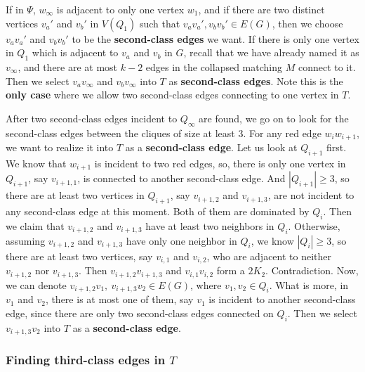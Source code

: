 \documentclass{amsart}
\theoremstyle{definition}
\begin{document}
If in $\Psi$, $w_{\infty}$ is adjacent to only one vertex $w_1$, and if there are two distinct vertices $v_a'$ and $v_b'$ in $V(Q_1)$ such that $v_av_a',v_bv_b'\in E(G)$, then we choose $v_av_a'$ and $v_bv_b'$ to be the {\bf second-class edges} we want. If there is only one vertex in $Q_1$ which is adjacent to $v_a$ and $v_b$ in $G$, recall that we have already named it as $v_{\infty}$, and there are at most $k-2$ edges in the collapsed matching $M$ connect to it. Then we select $v_av_{\infty}$ and $v_bv_{\infty}$ into $T$ as {\bf second-class edges}. Note this is the {\bf only case} where we allow two second-class edges connecting to one vertex in $T$.





After two second-class edges incident to $Q_{\infty}$ are found, we go on to look for the second-class edges between the cliques of size at least 3.
For any red edge $w_iw_{i+1}$, we want to realize it into $T$ as a {\bf second-class edge}. Let us look at $Q_{i+1}$ first. We know that $w_{i+1}$ is incident to two red edges, so, there is only one vertex in $Q_{i+1}$, say $v_{i+1,1}$, is connected to another second-class edge. And $|Q_{i+1}|\ge3$, so there are at least two vertices in $Q_{i+1}$, say $v_{i+1,2}$ and $v_{i+1,3}$, are not incident to any second-class edge at this moment. Both of them are dominated by $Q_i$. Then we claim that $v_{i+1,2}$ and $v_{i+1,3}$ have at least two neighbors in $Q_i$. Otherwise, assuming $v_{i+1,2}$ and $v_{i+1,3}$ have only one neighbor in $Q_i$, we know $|Q_i|\ge3$, so there are at least two vertices, say $v_{i,1}$ and $v_{i,2}$, who are adjacent to neither $v_{i+1,2}$ nor $v_{i+1,3}$. Then $v_{i+1,2}v_{i+1,3}$ and $v_{i,1}v_{i,2}$ form a $2K_2$. Contradiction. Now, we can denote $v_{i+1,2}v_1,~v_{i+1,3}v_2\in E(G)$, where $v_1,v_2\in Q_i$. What is more, in $v_1$ and $v_2$, there is at most one of them, say $v_1$ is incident to another second-class edge, since there are only two second-class edges connected on $Q_i$. Then we select $v_{i+1,3}v_2$ into $T$ as a {\bf second-class edge}.











\subsubsection{
Finding third-class edges in $T$}
\end{document}
